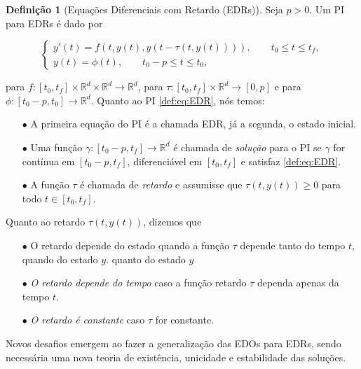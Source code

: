 \documentclass{beamer}
\newcommand{\R}{\mathbb{R}}
\theoremstyle{plain}
\theoremstyle{definition}
\newtheorem{defi}{Definição}
\begin{document}

\begin{frame}
    
    \begin{defi}[Equações Diferenciais com Retardo (EDRs)]
    Seja $p>0$. Um PI para EDRs é dado por

    \noindent
    \begin{equation}  
        \begin{cases}
            y'(t) = f(t, y(t), y(t - \tau(t, y(t)))), \qquad t_0 \leq t \leq t_f , \\
            y(t) = \phi(t), \qquad t_0 - p \leq t \leq t_0, 
        \end{cases}
        \label{def:eq:EDR}
    \end{equation}

    para $f:[t_0, t_f] \times \R^d \times \R^d \to \R^d$, para {\color{red}  $\tau: [t_0, t_f] \times \R^d \to [0, p]$ e para $\phi:[t_0 - p, t_0] \to \R^d $}. Quanto ao PI \eqref{def:eq:EDR}, nós temos:
        
    \begin{itemize}
        \item[$\bullet$] A primeira equação do PI é a chamada EDR, já a segunda, o estado inicial.
        \item[$\bullet$] Uma função $\gamma:[t_0 - p, t_f] \to \R^d$ é chamada de \textit{solução} para o PI se $\gamma$ for contínua em $[t_0 - p, t_f]$, diferenciável em $[t_0, t_f]$ e satisfaz \eqref{def:eq:EDR}.
        \item[$\bullet$] A função $\tau$ é chamada de \textit{retardo} e assumisse que $\tau(t, y(t))\geq0$ para todo $t \in [t_0, t_f]$.

    \end{itemize}
    \end{defi}


\end{frame}


\begin{frame}
    Quanto ao retardo $\tau(t, y(t))$, dizemos que
     \begin{itemize}
         \item[$\bullet$] {\color{red} O retardo depende do estado quando a função $\tau$ depende tanto do tempo $t$, quando do estado $y$.
         quanto do estado $y$}
         \item[$\bullet$] \textit{O retardo depende do tempo} caso a função retardo $\tau$ dependa apenas da tempo $t$.
         \item[$\bullet$] \textit{O retardo é constante} caso $\tau$ for constante.
     \end{itemize}
     
    Novos desafios emergem ao fazer a generalização das EDOs para EDRs, sendo necessária uma nova teoria de existência, unicidade e estabilidade das soluções.

\end{frame}
\end{document}
